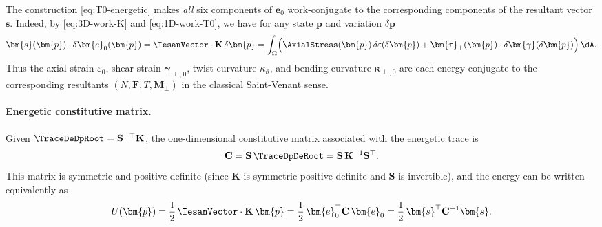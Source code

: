 \begin{remark}
The construction \eqref{eq:T0-energetic} makes \emph{all} six components of
$\bm{e}_0$ work-conjugate to the corresponding components of the resultant
vector $\bm{s}$. Indeed, by \eqref{eq:3D-work-K} and
\eqref{eq:1D-work-T0}, we have for any state $\bm{p}$ and variation
$\delta\bm{p}$
\[
\bm{s}(\bm{p})\cdot\delta\bm{e}_0(\bm{p})
=
\IesanVector\cdot \mathbf{K}\,\delta\bm{p}
=
\int_\Omega \Bigl(
\AxialStress(\bm{p})\,\delta\varepsilon(\delta\bm{p})
+
\bm{\tau}_\perp(\bm{p})\cdot\delta\bm{\gamma}(\delta\bm{p})
\Bigr)\,\dA.
\]
Thus the axial strain $\varepsilon_0$, shear strain $\bm{\gamma}_{\perp,0}$,
twist curvature $\kappa_\vartheta$, and bending curvature $\bm{\kappa}_{\perp,0}$
are each energy-conjugate to the corresponding resultants
$(N,\bm{F},T,\bm{M}_\perp)$ in the classical Saint-Venant sense.
\end{remark}

\paragraph{Energetic constitutive matrix.}

Given $\TraceDeDpRoot = \mathbf{S}^{-\top}\mathbf{K}$, the one-dimensional
constitutive matrix associated with the energetic trace is
\begin{equation*}
\mathbf{C}
=
\mathbf{S}\,\TraceDpDeRoot
=
\mathbf{S}\,\mathbf{K}^{-1}\mathbf{S}^\top.
\end{equation*}
This matrix is symmetric and positive definite (since $\mathbf{K}$ is symmetric
positive definite and $\mathbf{S}$ is invertible), and the energy can be
written equivalently as
\begin{equation}
U(\bm{p})
=
\frac{1}{2}\,\IesanVector\cdot\mathbf{K}\,\bm{p}
=
\frac{1}{2}\,\bm{e}_0^\top \mathbf{C}\,\bm{e}_0
=
\frac{1}{2}\,\bm{s}^\top \mathbf{C}^{-1}\bm{s}.
\end{equation}

